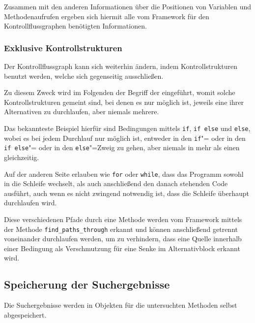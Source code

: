                Zusammen mit den anderen Informationen über die Positionen von Variablen und
                Methodenaufrufen ergeben sich hiermit alle vom Framework für den Kontrollflussgraphen benötigten Informationen.

            \subsubsection{Exklusive Kontrollstrukturen}
                Der Kontrollflussgraph kann sich weiterhin ändern,
                indem Kontrollstrukturen benutzt werden,
                welche sich gegenseitig ausschließen.

                Zu diesem Zweck wird im Folgenden der Begriff der
                 eingeführt,
                womit solche Kontrollstrukturen gemeint sind,
                bei denen es nur möglich ist,
                jeweils eine ihrer Alternativen zu durchlaufen,
                aber niemals mehrere.

                Das bekannteste Beispiel hierfür sind Bedingungen mittels
                \lstinline{if},
                \lstinline{if else} und
                \lstinline{else},
                wobei es bei jedem Durchlauf nur möglich ist,
                entweder in den
                \lstinline{if}"= oder
                in den
                \lstinline{if else}"= oder
                in den
                \lstinline{else}"=Zweig zu gehen,
                aber niemals in mehr als einen gleichzeitig.

                Auf der anderen Seite erlauben
                 wie
                \lstinline{for} oder
                \lstinline{while},
                dass das Programm sowohl in die Schleife wechselt,
                als auch anschließend den danach stehenden Code ausführt,
                auch wenn es nicht zwingend notwendig ist,
                dass die Schleife überhaupt durchlaufen wird.

                Diese verschiedenen Pfade durch eine Methode werden vom Framework mittels der Methode
                \lstinline{find_paths_through} erkannt und
                können anschließend getrennt voneinander durchlaufen werden,
                um zu verhindern,
                dass eine Quelle innerhalb einer Bedingung als Verschmutzung für eine Senke im Alternativblock erkannt wird.

        \subsection{Speicherung der Suchergebnisse}
            Die Suchergebnisse werden in Objekten für die untersuchten Methoden selbst abgespeichert.

